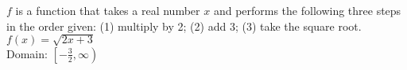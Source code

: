 {$f$ is a function that takes a real number $x$ and performs the following three steps in the order given: (1) multiply by 2; (2) add 3; (3) take the square root.
}
{$f(x) = \sqrt{2x+3}$ \\ Domain:  $\left[ -\frac{3}{2}, \infty \right)$}